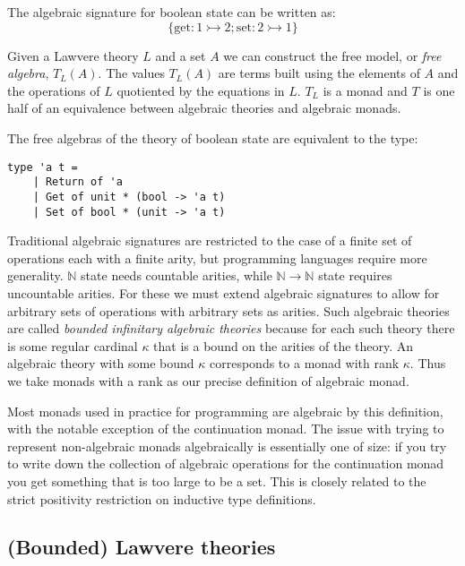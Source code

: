 \documentclass[acmsmall, screen, review, anonymous]{acmart}
\theoremstyle{definition}
\newcommand{\nat}{\mathbb{N}}
\newcommand{\types}{\mathrel{:}}
\begin{document}
\begin{example}
  The algebraic signature for boolean state can be written as:
  \begin{equation*}
    \{ \mathrm{get} \types 1 \rightarrowtail 2; \mathrm{set} \types 2 \rightarrowtail 1 \}
  \end{equation*}
\end{example}

Given a Lawvere theory $L$ and a set $A$ we can construct the free
model, or \emph{free algebra}, $T_L(A)$. The values $T_L(A)$ are terms
built using the elements of $A$ and the operations of $L$ quotiented by
the equations in $L$. $T_L$ is a monad and $T$ is one half of an
equivalence between algebraic theories and algebraic monads.

\begin{example}
  The free algebras of the theory of boolean state are equivalent
  to the type:
  \begin{lstlisting}[style=oxcaml]
  type 'a t =
    | Return of 'a
    | Get of unit * (bool -> 'a t)
    | Set of bool * (unit -> 'a t)
  \end{lstlisting}
\end{example}

Traditional algebraic signatures are restricted to the case of a finite
set of operations each with a finite arity, but programming languages
require more generality. $\nat$ state needs countable arities, while
$\nat \rightarrow \nat$ state requires uncountable arities.
For these we must extend algebraic signatures to allow for arbitrary
sets of operations with arbitrary sets as arities. Such algebraic
theories are called \emph{bounded infinitary algebraic theories} because
for each such theory there is some regular cardinal $\kappa$ that is a
bound on the arities of the theory. An algebraic theory with some bound
$\kappa$ corresponds to a monad with rank $\kappa$. Thus we take monads
with a rank as our precise definition of algebraic monad.

Most monads used in practice for programming are algebraic by this
definition, with the notable exception of the continuation monad. The
issue with trying to represent non-algebraic monads algebraically is
essentially one of size: if you try to write down the collection of
algebraic operations for the continuation monad you get something that
is too large to be a set. This is closely related to the strict
positivity restriction on inductive type definitions.

\subsection{(Bounded) Lawvere theories}
\end{document}
